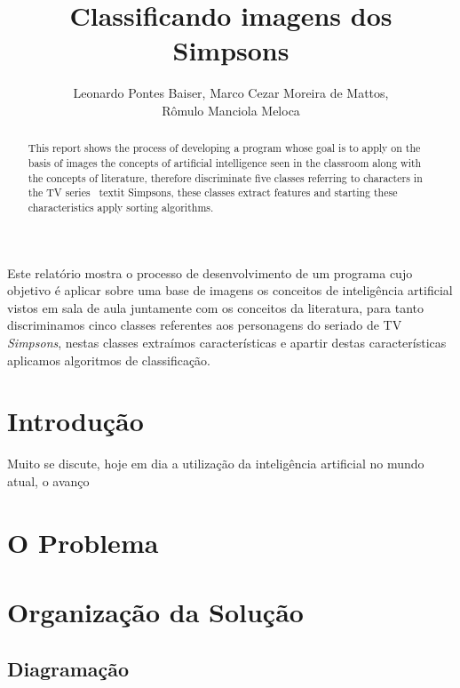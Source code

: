 \documentclass[12pt]{article}
\title{Classificando imagens dos Simpsons}
\author{Leonardo Pontes Baiser\inst{1}, Marco Cezar Moreira de Mattos\inst{1},\\
		Rômulo Manciola Meloca\inst{1}}
\begin{document}
	
\maketitle

\begin{abstract}

	This report shows the process of developing a program whose goal is to apply on the basis of images the 	concepts of artificial intelligence seen in the classroom along with the concepts of literature, therefore discriminate five classes referring to characters in the TV series \ textit {Simpsons}, these classes extract features and starting these characteristics apply sorting algorithms.

	\end{abstract}
     
\begin{resumo} 
  Este relatório mostra o processo de desenvolvimento de um programa cujo objetivo é aplicar sobre uma base de imagens os conceitos de inteligência artificial vistos em sala de aula juntamente com os conceitos da literatura, para tanto discriminamos cinco classes referentes aos personagens do seriado de TV \textit{Simpsons}, nestas classes extraímos características e apartir destas características aplicamos algoritmos de classificação.	
\end{resumo}

\section{Introdução}\label{sec:introducao}

	Muito se discute, hoje em dia a utilização da inteligência artificial no mundo atual, o avanço 

\section{O Problema}\label{sec:problema}


\section{Organização da Solução}\label{sec:solucao}


\subsection{Diagramação}\label{sec:diagramacao}
\end{document}
